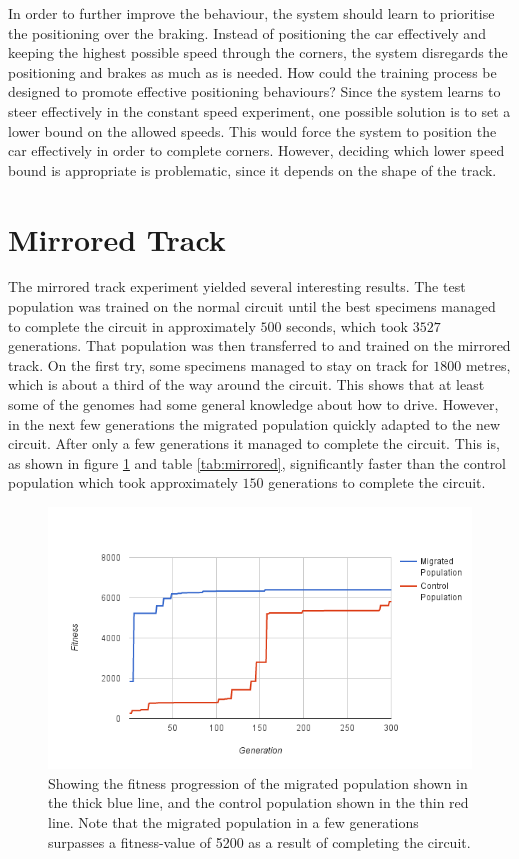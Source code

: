 In order to further improve the behaviour, the system should learn to prioritise the positioning over the braking. Instead of positioning the car effectively and keeping the highest possible speed through the corners, the system disregards the positioning and brakes as much as is needed. How could the training process be designed to promote effective positioning behaviours? Since the system learns to steer effectively in the constant speed experiment, one possible solution is to set a lower bound on the allowed speeds. This would force the system to position the car effectively in order to complete corners. However, deciding which lower speed bound is appropriate is problematic, since it depends on the shape of the track. 


\section{Mirrored Track}
\label{result:mirror}
The mirrored track experiment yielded several interesting results. The test population was trained on the normal circuit until the best specimens managed to complete the circuit in approximately $500$ seconds, which took $3527$ generations. That population was then transferred to and trained on the mirrored track. On the first try, some specimens managed to stay on track for $1800$ metres, which is about a third of the way around the circuit. This shows that at least some of the genomes had some general knowledge about how to drive. However, in the next few generations the migrated population quickly adapted to the new circuit. After only a few generations it managed to complete the circuit. This is, as shown in figure \ref{fig:mirrordata} and table \ref{tab:mirrored}, significantly faster than the control population which took approximately $150$ generations to complete the circuit. 

\begin{figure}[H]
\includegraphics[width=\textwidth]{report/images/graphs/mirror_migration}
\centering
\caption{Showing the fitness progression of the migrated population shown in the thick blue line, and the control population shown in the thin red line. Note that the migrated population in a few generations surpasses a fitness-value of 5200 as a result of completing the circuit.}
\label{fig:mirrordata}
\end{figure}

